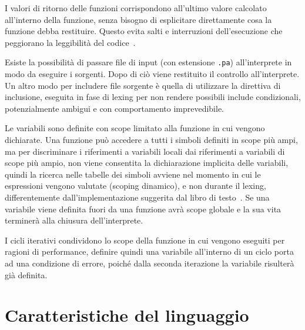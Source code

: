 \documentclass[10pt]{article}
\begin{document}
I valori di ritorno delle funzioni corrispondono all'ultimo valore calcolato all'interno della funzione, senza bisogno di esplicitare direttamente cosa la funzione debba restituire. Questo evita salti e interruzioni dell'esecuzione che peggiorano la leggibilità del codice~\cite{dijkstra1968letters}.

Esiste la possibilità di passare file di input (con estensione \texttt{.pa}) all'interprete in modo da eseguire i sorgenti. Dopo di ciò viene restituito il controllo all'interprete. Un altro modo per includere file sorgente è quella di utilizzare la direttiva di inclusione, eseguita in fase di lexing per non rendere possibili include condizionali, potenzialmente ambigui e con comportamento imprevedibile.

Le variabili sono definite con scope limitato alla funzione in cui vengono dichiarate. Una funzione può accedere a tutti i simboli definiti in scope più ampi, ma per discriminare i riferimenti a variabili locali dai riferimenti a variabili di scope più ampio, non viene consentita la dichiarazione implicita delle variabili, quindi la ricerca nelle tabelle dei simboli avviene nel momento in cui le espressioni vengono valutate (scoping dinamico), e non durante il lexing, differentemente dall'implementazione suggerita dal libro di testo~\cite{levine2009flex}. Se una variabile viene definita fuori da una funzione avrà scope globale e la sua vita terminerà alla chiusura dell'interprete.

I cicli iterativi condividono lo scope della funzione in cui vengono eseguiti per ragioni di performance, definire quindi una variabile all'interno di un ciclo porta ad una condizione di errore, poiché dalla seconda iterazione la variabile risulterà già definita.\\





\section{Caratteristiche del linguaggio}\label{section:caratteristiche-linguaggio}
\end{document}
